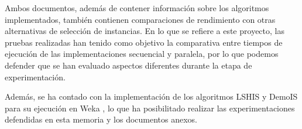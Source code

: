 Ambos documentos, además de contener información sobre los algoritmos implementados, también contienen comparaciones de rendimiento con otras alternativas de selección de instancias. En lo que se refiere a este proyecto, las pruebas realizadas han tenido como objetivo la comparativa entre tiempos de ejecución de las implementaciones secuencial y paralela, por lo que podemos defender que se han evaluado aspectos diferentes durante la etapa de experimentación.

Además, se ha contado con la implementación de los algoritmos LSHIS y DemoIS para su ejecución en Weka \cite{arnaiz2012herramienta}, lo que ha posibilitado realizar las experimentaciones defendidas en esta memoria y los documentos anexos.
